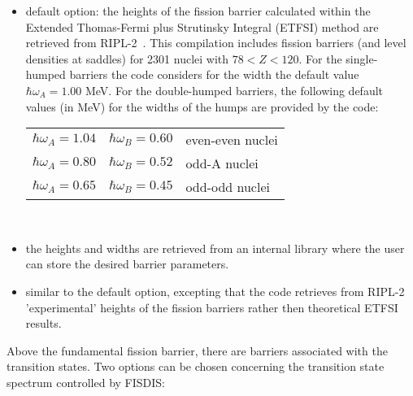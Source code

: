 \documentclass[twocolumn,amsmath,amssymb,10pt,groupedaddress,a4paper]{revtex4}
\begin{document}
\begin{itemize}
\item default option: the heights of the fission barrier calculated
within the Extended Thomas-Fermi plus Strutinsky Integral (ETFSI)
method are retrieved from RIPL-2~\cite{RIPL2}. This compilation
includes fission barriers (and level densities at saddles) for 2301
nuclei with $78<Z<120$. For the single-humped barriers the code considers
for the width the default value $\hbar\omega_{A}=1.00$ MeV. For the
double-humped barriers, the following default values (in MeV) for
the widths of the humps are provided by the code:
\\
\begin{tabular}{lll}
 $\hbar\omega_{A}=1.04$&
 $\hbar\omega_{B}=0.60$&
 even-even nuclei\tabularnewline
 $\hbar\omega_{A}=0.80$&
 $\hbar\omega_{B}=0.52$&
 odd-A nuclei\tabularnewline
 $\hbar\omega_{A}=0.65$&
 $\hbar\omega_{B}=0.45$&
 odd-odd nuclei \tabularnewline
\end{tabular}\\
\item the heights and widths are retrieved from an internal library
\noindent where the user can store the desired barrier parameters.
\item  similar to the default option, excepting that the code retrieves
from RIPL-2 'experimental' heights of the fission barriers rather
then theoretical ETFSI results.
\end{itemize}
Above the fundamental fission barrier, there are barriers associated
 with the transition states.
Two options can be chosen concerning the transition state spectrum controlled
by FISDIS:
\end{document}
